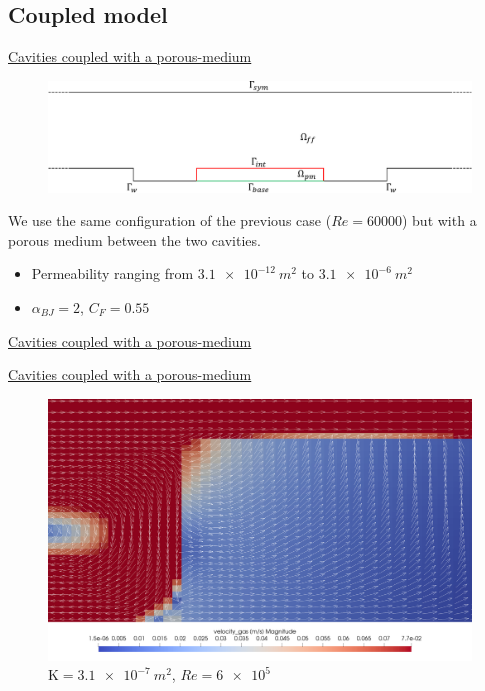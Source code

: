 \documentclass{beamer}
\begin{document}
\subsection*{Coupled model}
\begin{frame}[label=coupled]{\hyperlink{coupledSupp}{Cavities coupled with a 
porous-medium}}
\begin{figure}
	\centering
	\includegraphics[width=\textwidth]{cavities_multidomain.pdf}
\end{figure}
We use the same configuration of the previous case ($Re=60000$) but with a 
porous medium between the two cavities.
\begin{itemize}
	\item Permeability ranging from $\SI{3.1e-12}{m^2}$ to $\SI{3.1e-6}{m^2}$
	\item $\alpha_{BJ} = 2$, $C_F=0.55$
\end{itemize}
\end{frame}
\begin{frame}{\hyperlink{coupledSupp}{Cavities coupled with a porous-medium}}
\begin{figure}
	\centering
	\hspace{-0.5cm}
	
\end{figure}
\end{frame}
\begin{frame}{\hyperlink{coupledSupp}{Cavities coupled with a porous-medium}}
\begin{figure}
	\centering
	\includegraphics[height=0.82\textheight]{coupled_first_cavity.png}
	\caption{\tiny $\mathrm{K}=\SI{3.1e-7}{m^2}$, $Re=\num{6e5}$}
\end{figure}
\end{frame}
\end{document}
